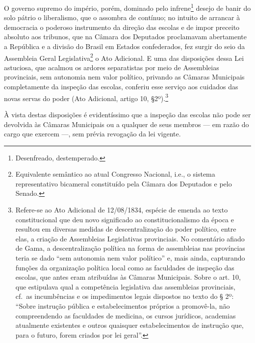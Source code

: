O governo supremo do império, porém, dominado pelo infrene\footnote{
  Desenfreado, destemperado.} desejo de banir do solo pátrio o
liberalismo, que o assombra de contínuo; no intuito de arrancar à
democracia o poderoso instrumento da direção das escolas e de impor
preceito absoluto aos tribunos, que na Câmara dos Deputados proclamavam
abertamente a República e a divisão do Brasil em Estados confederados,
fez surgir do seio da Assembleia Geral Legislativa\footnote{Equivalente semântico ao atual 
Congresso Nacional, i.e., o sistema representativo bicameral constituído pela 
Câmara dos Deputados e pelo Senado.} o Ato Adicional. E uma das disposições 
dessa Lei astuciosa, que acalmou os ardores separatistas por meio de 
Assembleias provinciais, sem autonomia nem valor político, privando as 
Câmaras Municipais completamente da inspeção das escolas, conferiu esse 
serviço aos cuidados das novas servas do poder (Ato Adicional, artigo 10, 
§2º).\footnote{Refere-se ao Ato Adicional de 12/08/1834, espécie de
  emenda ao texto constitucional que deu novo significado ao
  constitucionalismo da época e resultou em diversas medidas de
  descentralização do poder político, entre elas, a criação de
  Assembleias Legislativas provinciais. No comentário afiado de Gama, a
  descentralização política na forma de assembleias nas províncias teria
  se dado ``sem autonomia nem valor político'' e, mais ainda, capturando
  funções da organização política local como as faculdades de inspeção
  das escolas, que antes eram atribuídas às Câmaras Municipais. Sobre o
  art. 10, que estipulava qual a competência legislativa das assembleias
  provinciais, cf.~as incumbências e os impedimentos legais dispostos no
  texto do § 2º: ``Sobre instrução pública e estabelecimentos próprios a
  promovê-la, não compreendendo as faculdades de medicina, os cursos
  jurídicos, academias atualmente existentes e outros quaisquer
  estabelecimentos de instrução que, para o futuro, forem criados por
  lei geral''.}

À vista destas disposições é evidentíssimo que a inspeção das escolas
não pode ser devolvida às Câmaras Municipais ou a qualquer de seus
membros --- em razão do cargo que exercem ---, sem prévia revogação da lei
vigente.

